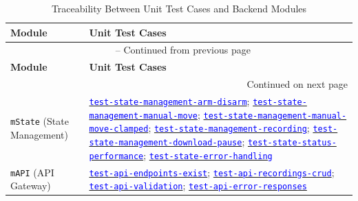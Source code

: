 \documentclass[12pt, titlepage]{article}
\newcommand{\mref}[1]{\texttt{#1}}
\newcommand{\tid}[1]{\hyperlink{tid:#1}{\textcolor{blue}{\texttt{#1}}}}
\begin{document}
\begin{longtable}{|p{4.5cm}|p{10cm}|}
  \caption{Traceability Between Unit Test Cases and Backend Modules} \label{TblUTM-Backend}                                                                                                                                                                                                                                                      \\
  \hline
  \textbf{Module}                                    & \textbf{Unit Test Cases}                                                                                                                                                                                                                                                                  \\
  \hline
  \endfirsthead
  \multicolumn{2}{c}{\tablename\ \thetable{} -- Continued from previous page}                                                                                                                                                                                                                                                                    \\
  \hline
  \textbf{Module}                                    & \textbf{Unit Test Cases}                                                                                                                                                                                                                                                                  \\
  \hline
  \endhead
  \hline
  \multicolumn{2}{r}{Continued on next page}                                                                                                                                                                                                                                                                                                     \\
  \endfoot
  \hline
  \endlastfoot
  \mref{mState} (State Management)                   & \tid{test-state-management-arm-disarm}; \tid{test-state-management-manual-move}; \tid{test-state-management-manual-move-clamped}; \tid{test-state-management-recording}; \tid{test-state-management-download-pause}; \tid{test-state-status-performance}; \tid{test-state-error-handling} \\
  \hline
  \mref{mAPI} (API Gateway)                          & \tid{test-api-endpoints-exist}; \tid{test-api-recordings-crud}; \tid{test-api-validation}; \tid{test-api-error-responses}                                                                                                                                                                 \\

\end{longtable}
\end{document}
